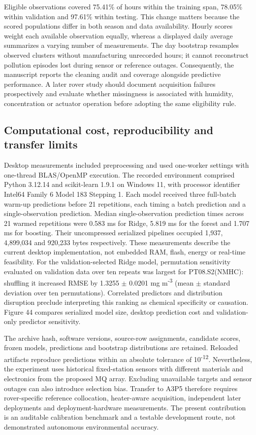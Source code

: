 \documentclass[11pt,a4paper]{article}
\begin{document}
Eligible observations covered 75.41\% of hours within the training span, 78.05\% within validation and 97.61\% within testing. This change matters because the scored populations differ in both season and data availability. Hourly scores weight each available observation equally, whereas a displayed daily average summarizes a varying number of measurements. The day bootstrap resamples observed clusters without manufacturing unrecorded hours; it cannot reconstruct pollution episodes lost during sensor or reference outages. Consequently, the manuscript reports the cleaning audit and coverage alongside predictive performance. A later rover study should document acquisition failures prospectively and evaluate whether missingness is associated with humidity, concentration or actuator operation before adopting the same eligibility rule.

\FloatBarrier

\subsection{Computational cost, reproducibility and transfer limits}\label{sec:10.5}

Desktop measurements included preprocessing and used one-worker settings with one-thread BLAS/OpenMP execution. The recorded environment comprised Python 3.12.14 and scikit-learn 1.9.1 on Windows 11, with processor identifier Intel64 Family 6 Model 183 Stepping 1. Each model received three full-batch warm-up predictions before 21 repetitions, each timing a batch prediction and a single-observation prediction. Median single-observation prediction times across 21 warmed repetitions were 0.583 ms for Ridge, 5.819 ms for the forest and 1.707 ms for boosting. Their uncompressed serialized pipelines occupied 1,937, 4,899,034 and 920,233 bytes respectively. These measurements describe the current desktop implementation, not embedded RAM, flash, energy or real-time feasibility. For the validation-selected Ridge model, permutation sensitivity evaluated on validation data over ten repeats was largest for PT08.S2(NMHC): shuffling it increased RMSE by 1.3255 \ensuremath{\pm} 0.0201 mg m\textsuperscript{-3} (mean \ensuremath{\pm} standard deviation over ten permutations). Correlated predictors and distribution disruption preclude interpreting this ranking as chemical specificity or causation. Figure 44 compares serialized model size, desktop prediction cost and validation-only predictor sensitivity.

The archive hash, software versions, source-row assignments, candidate scores, frozen models, predictions and bootstrap distributions are retained. Reloaded artifacts reproduce predictions within an absolute tolerance of 10\textsuperscript{-12}. Nevertheless, the experiment uses historical fixed-station sensors with different materials and electronics from the proposed MQ array. Excluding unavailable targets and sensor outages can also introduce selection bias. Transfer to A3P5 therefore requires rover-specific reference collocation, heater-aware acquisition, independent later deployments and deployment-hardware measurements. The present contribution is an auditable calibration benchmark and a testable development route, not demonstrated autonomous environmental accuracy.
\end{document}
